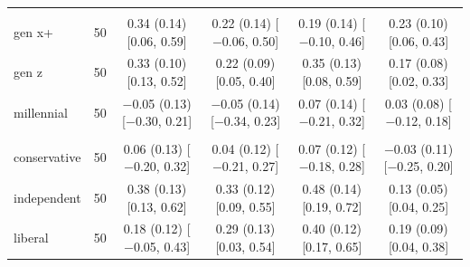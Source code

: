 \begin{table}[t]
\begin{tabular}{@{}lr*{4}{c}@{}}
\addlinespace
\multicolumn{6}{@{}l}{\textit{Age (D)}} \\
\quad gen x+ & 50 & \makecell{0.34 (0.14)\\ {[}0.06, 0.59{]}} & \makecell{0.22 (0.14)\\ {[}$-$0.06, 0.50{]}} & \makecell{0.19 (0.14)\\ {[}$-$0.10, 0.46{]}} & \makecell{0.23 (0.10)\\ {[}0.06, 0.43{]}} \\
\quad gen z & 50 & \makecell{0.33 (0.10)\\ {[}0.13, 0.52{]}} & \makecell{0.22 (0.09)\\ {[}0.05, 0.40{]}} & \makecell{0.35 (0.13)\\ {[}0.08, 0.59{]}} & \makecell{0.17 (0.08)\\ {[}0.02, 0.33{]}} \\
\quad millennial & 50 & \makecell{$-$0.05 (0.13)\\ {[}$-$0.30, 0.21{]}} & \makecell{$-$0.05 (0.14)\\ {[}$-$0.34, 0.23{]}} & \makecell{0.07 (0.14)\\ {[}$-$0.21, 0.32{]}} & \makecell{0.03 (0.08)\\ {[}$-$0.12, 0.18{]}} \\
\addlinespace
\multicolumn{6}{@{}l}{\textit{Politics (N)}} \\
\quad conservative & 50 & \makecell{0.06 (0.13)\\ {[}$-$0.20, 0.32{]}} & \makecell{0.04 (0.12)\\ {[}$-$0.21, 0.27{]}} & \makecell{0.07 (0.12)\\ {[}$-$0.18, 0.28{]}} & \makecell{$-$0.03 (0.11)\\ {[}$-$0.25, 0.20{]}} \\
\quad independent & 50 & \makecell{0.38 (0.13)\\ {[}0.13, 0.62{]}} & \makecell{0.33 (0.12)\\ {[}0.09, 0.55{]}} & \makecell{0.48 (0.14)\\ {[}0.19, 0.72{]}} & \makecell{0.13 (0.05)\\ {[}0.04, 0.25{]}} \\
\quad liberal & 50 & \makecell{0.18 (0.12)\\ {[}$-$0.05, 0.43{]}} & \makecell{0.29 (0.13)\\ {[}0.03, 0.54{]}} & \makecell{0.40 (0.12)\\ {[}0.17, 0.65{]}} & \makecell{0.19 (0.09)\\ {[}0.04, 0.38{]}} \\

\end{tabular}
\end{table}
